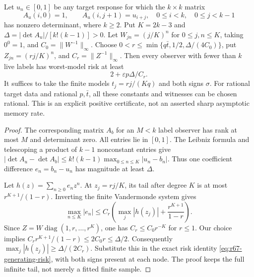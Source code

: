 \begin{proposition}\label{prop:r67-finite-witness}
Let $u_n\in[0,1]$ be any target response for which the $k\times k$ matrix
\[
 A_u(i,0)=1,\qquad A_u(i,j+1)=u_{i+j},
 \quad 0\le i<k,\quad0\le j<k-1
\]
has nonzero determinant, where $k\ge2$. Put $K=2k-3$ and
$\Delta=|\det A_u|/[k!(k-1)]>0$.
Let $W_{jn}=(j/K)^n$ for $0\le j,n\le K$, taking $0^0=1$, and $C_0=\|W^{-1}\|_\infty$. Choose $0<r\le\min\{q\bar t,1/2,\Delta/(4C_0)\}$, put $Z_{jn}=(rj/K)^n$, and $C_r=\|Z^{-1}\|_\infty$.
Then every observer with fewer than $k$ live labels has worst-model risk at least
\begin{equation}\label{eq:r67-finite-gap}
 2+\varepsilon p\Delta/C_r.
\end{equation}
It suffices to take the finite models $t_j=rj/(Kq)$ and both signs $\sigma$. For rational target data and rational $p,\bar t$, all these constants and witnesses can be chosen rational. This is an explicit positive certificate, not an asserted sharp asymptotic memory rate.
\end{proposition}
\begin{proof}
The corresponding matrix $A_b$ for an $M<k$ label observer has rank at most $M$ and determinant zero. All entries lie in $[0,1]$. The Leibniz formula and telescoping a product of $k-1$ nonconstant entries give
$|\det A_u-\det A_b|\le k!(k-1)\max_{0\le n\le K}|u_n-b_n|$.
Thus one coefficient difference $e_n=b_n-u_n$ has magnitude at least $\Delta$.

Let $h(z)=\sum_{n\ge0}e_nz^n$. At $z_j=rj/K$, its tail after degree $K$ is at most $r^{K+1}/(1-r)$. Inverting the finite Vandermonde system gives
\[
 \max_{n\le K}|e_n|\le
 C_r\left(\max_j|h(z_j)|+\frac{r^{K+1}}{1-r}\right).
\]
Since $Z=W\operatorname{diag}(1,r,\ldots,r^K)$, one has $C_r\le C_0r^{-K}$ for $r\le1$. Our choice implies
$C_r r^{K+1}/(1-r)\le2C_0r\le\Delta/2$.
Consequently $\max_j|h(z_j)|\ge\Delta/(2C_r)$. Substitute this in the exact risk identity \eqref{eq:r67-generating-risk}, with both signs present at each node. The proof keeps the full infinite tail, not merely a fitted finite sample.
\end{proof}


